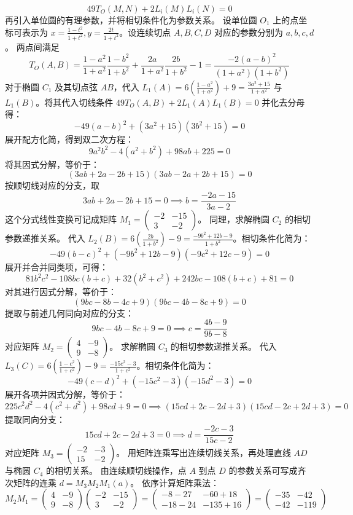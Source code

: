 \begin{solution}
$$ 49 T_O(M,N) + 2 L_i(M)L_i(N) = 0 $$
再引入单位圆的有理参数，并将相切条件化为参数关系。
设单位圆 $O_1$ 上的点坐标可表示为 $x = \frac{1-t^2}{1+t^2}, y = \frac{2t}{1+t^2}$。设连续切点 $A, B, C, D$ 对应的参数分别为 $a, b, c, d$。
两点间满足
$$ T_O(A,B) = \frac{1-a^2}{1+a^2} \frac{1-b^2}{1+b^2} + \frac{2a}{1+a^2} \frac{2b}{1+b^2} - 1 = \frac{-2(a-b)^2}{(1+a^2)(1+b^2)} $$
对于椭圆 $C_1$ 及其切点弦 $AB$，代入 $L_1(A) = 6\left( \frac{1-a^2}{1+a^2} \right) + 9 = \frac{3a^2+15}{1+a^2}$ 与 $L_1(B)$。将其代入切线条件 $49 T_O(A,B) + 2 L_1(A)L_1(B) = 0$ 并化去分母得：
$$ -49(a-b)^2 + (3a^2+15)(3b^2+15) = 0 $$
展开配方化简，得到双二次方程：
$$ 9a^2b^2 - 4(a^2+b^2) + 98ab + 225 = 0 $$
将其因式分解，等价于：
$$ (3ab + 2a - 2b + 15)(3ab - 2a + 2b + 15) = 0 $$
按顺切线对应的分支，取
$$ 3ab + 2a - 2b + 15 = 0 \implies b = \frac{-2a-15}{3a-2} $$
这个分式线性变换可记成矩阵 $M_1 = \begin{pmatrix} -2 & -15 \\ 3 & -2 \end{pmatrix}$。
同理，求解椭圆 $C_2$ 的相切参数递推关系。
代入 $L_2(B) = 6\left( \frac{2b}{1+b^2} \right) - 9 = \frac{-9b^2+12b-9}{1+b^2}$。相切条件化简为：
$$ -49(b-c)^2 + (-9b^2+12b-9)(-9c^2+12c-9) = 0 $$
展开并合并同类项，可得：
$$ 81b^2c^2 - 108bc(b+c) + 32(b^2+c^2) + 242bc - 108(b+c) + 81 = 0 $$
对其进行因式分解，等价于：
$$ (9bc - 8b - 4c + 9)(9bc - 4b - 8c + 9) = 0 $$
提取与前述几何同向对应的分支：
$$ 9bc - 4b - 8c + 9 = 0 \implies c = \frac{4b-9}{9b-8} $$
对应矩阵 $M_2 = \begin{pmatrix} 4 & -9 \\ 9 & -8 \end{pmatrix}$。
求解椭圆 $C_3$ 的相切参数递推关系。
代入 $L_3(C) = 6\left( \frac{1-c^2}{1+c^2} \right) - 9 = \frac{-15c^2-3}{1+c^2}$。相切条件化简为：
$$ -49(c-d)^2 + (-15c^2-3)(-15d^2-3) = 0 $$
展开各项并因式分解，等价于：
$$ 225c^2d^2 - 4(c^2+d^2) + 98cd + 9 = 0 \implies (15cd + 2c - 2d + 3)(15cd - 2c + 2d + 3) = 0 $$
提取同向分支：
$$ 15cd + 2c - 2d + 3 = 0 \implies d = \frac{-2c-3}{15c-2} $$
对应矩阵 $M_3 = \begin{pmatrix} -2 & -3 \\ 15 & -2 \end{pmatrix}$。
用矩阵连乘写出连续切线关系，再处理直线 $AD$ 与椭圆 $C_4$ 的相切关系。
由连续顺切线操作，点 $A$ 到点 $D$ 的参数关系可写成齐次矩阵的连乘 $d = M_3 M_2 M_1 (a)$。
依序计算矩阵乘法：
$$ M_2 M_1 = \begin{pmatrix} 4 & -9 \\ 9 & -8 \end{pmatrix} \begin{pmatrix} -2 & -15 \\ 3 & -2 \end{pmatrix} = \begin{pmatrix} -8 - 27 & -60 + 18 \\ -18 - 24 & -135 + 16 \end{pmatrix} = \begin{pmatrix} -35 & -42 \\ -42 & -119 \end{pmatrix} $$

\end{solution}
